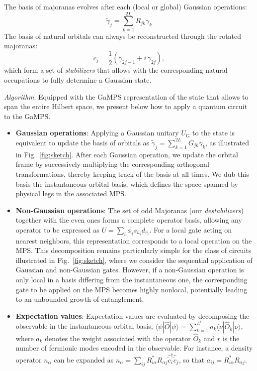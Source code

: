 \documentclass[a4paper, twocolumn, superscriptaddress, longbibliography]{revtex4-2}
\begin{document}
	The basis of majoranas evolves after each (local or global) Gaussian operations:
	\begin{equation}
		\tilde{\gamma}_j = \sum_{k=1}^{2L} R_{jk}\gamma_{k}
	\end{equation}
	The basis of natural orbitals can always be reconstructed through the rotated majoranas:
	\begin{equation}
		\tilde{c}_{j}^{} = \frac{1}{2}\left(\tilde{\gamma}_{2j-1} + i\,\tilde{\gamma}_{2j}\right),
	\end{equation}
	which form a set of \emph{stabilizers} that allows with the corresponding natural occupations to fully determine a Gaussian state.

	\emph{Algorithm}: Equipped with the GaMPS representation of the state that allows to span the entire Hilbert space, we present below how to apply a quantum circuit to the GaMPS.
	\begin{itemize}
		\item {\bf Gaussian operations}: Applying a Gaussian unitary $U_{\mathrm{G}}$ to the state is equivalent to update the basis of orbitals as $\tilde{\gamma}_j = \sum_{k=1}^{2L} G_{jk}\gamma_{k}$, as illustrated in Fig.~\ref{fig:sketch}. After each Gaussian operation, we update the orbital frame by successively multiplying the corresponding orthogonal transformations, thereby keeping track of the basis at all times. We dub this basis the instantaneous orbital basis, which defines the space spanned by physical legs in the associated MPS.
		\item {\bf Non-Gaussian operations}: The set of odd Majoranas (our \emph{destabilizers}) together with the even ones  forms a complete operator basis, allowing any operator to be expressed as $U = \sum_{i} \phi_{i} s_{u_i}d_{v_i}$. For a local gate acting on nearest neighbors, this representation corresponds to a local operation on the MPS. This decomposition remains particularly simple for the class of circuits illustrated in Fig.~\ref{fig:sketch}, where we consider the sequential application of Gaussian and non-Gaussian gates. However, if a non-Gaussian operation is only local in a basis differing from the instantaneous one, the corresponding gate to be applied on the MPS becomes highly nonlocal, potentially leading to an unbounded growth of entanglement.
		\item {\bf Expectation values}: Expectation values are evaluated by decomposing the observable in the instantaneous orbital basis, $\langle \psi | \hat{O} | \psi \rangle = \sum_{k=1}^{L^{r}} a_{k}\langle \nu | \hat{O}_k | \nu \rangle$, where $a_k$ denotes the weight associated with the operator $\hat{O}_{k}$ and $r$ is the number of fermionic modes encoded in the observable. For instance, a density operator $n_\alpha$ can be expanded as $n_\alpha = \sum_{ij} R^{*}_{i\alpha} R_{\alpha j} \hat{\tilde{c}}^{\dagger}_{i}\hat{\tilde{c}}^{}_{j}$, so that $a_{ij} = R^{*}_{i\alpha} R_{\alpha j}$.
	\end{itemize}
\end{document}
